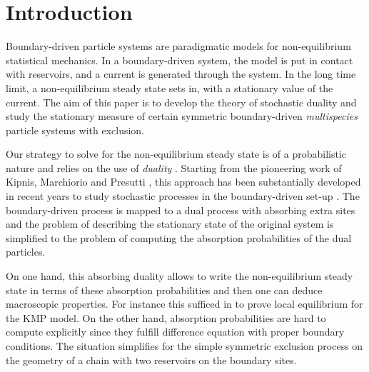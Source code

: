\documentclass[10pt]{article}
\numberwithin{equation}{section}
\numberwithin{equation}{subsection}
\begin{document}

\newpage
\tableofcontents

 \newpage
\section{Introduction} 
Boundary-driven particle systems are paradigmatic models for non-equilibrium statistical mechanics. In a boundary-driven system, the model is put in contact with reservoirs, 
and a current is generated through the system. In the long time limit, a non-equilibrium steady state sets in, with a stationary value of the current.
 The aim of this paper is to develop the theory of stochastic duality and  study the stationary measure of certain symmetric boundary-driven {\em multispecies} particle systems with exclusion.

Our strategy to solve for the non-equilibrium steady state is of a probabilistic nature and relies on the use of {\em duality} \cite{schutzSandow}. Starting from the pioneering work of Kipnis, Marchiorio and Presutti \cite{KMP}, this approach
has been substantially developed in recent years to study stochastic processes in the boundary-driven set-up \cite{giardina2009duality,carinci2013duality}.
The boundary-driven process is mapped to a dual process with absorbing extra sites and the problem of describing the stationary state of the original system
is simplified to the problem of computing the absorption probabilities of the dual particles. 




On one hand, this absorbing duality allows to write the non-equilibrium steady state in terms of these absorption probabilities and then
one can deduce macroscopic properties. For instance this sufficed in  \cite{KMP} to prove local equilibrium for the KMP model.
On the other hand, absorption probabilities are hard to compute explicitly since they fulfill difference equation with proper boundary conditions. 
The situation simplifies {\color{blue} for the simple symmetric exclusion process \cite{schutzSandow} on the geometry of } a chain with two reservoirs on the boundary sites. 
% 
\end{document}
